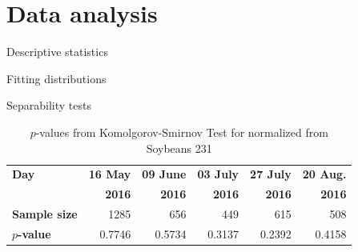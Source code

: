 \documentclass[journal]{IEEEtran}
\begin{document}



\section{Data analysis}

Descriptive statistics

Fitting distributions

Separability tests




\begin{table}[hbt]
  \centering
  \caption{$p$-values from Komolgorov-Smirnov Test for normalized from Soybeans 231}
  \label{tab:pvalues_alpha_sb231}
  \begin{tabular}{lrrrrr}
    \toprule
    \textbf{Day} & \textbf{16 May} & \textbf{09 June} & \textbf{03 July} & \textbf{27 July} & \textbf{20 Aug.}\\ 
                 & \textbf{2016} & \textbf{2016} & \textbf{2016} & \textbf{2016} & \textbf{2016}\\\midrule
    \textbf{Sample size} & 1285 & 656 & 449 & 615 & 508\\
    \textbf{$p$-value} & 0.7746 & 0.5734 & 0.3137 & 0.2392 & 0.4158\\
    \bottomrule
  \end{tabular}
\end{table}
\end{document}
